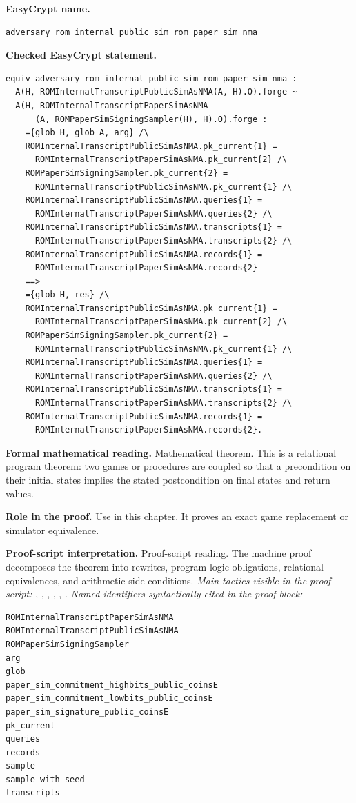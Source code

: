 \begin{formaltheorem}
\noindent\textbf{EasyCrypt name.}
\begin{lstlisting}[language=EasyCrypt,basicstyle=\ttfamily\scriptsize]
adversary_rom_internal_public_sim_rom_paper_sim_nma
\end{lstlisting}
\noindent\textbf{Checked EasyCrypt statement.}
\begin{lstlisting}[language=EasyCrypt,basicstyle=\ttfamily\scriptsize]
equiv adversary_rom_internal_public_sim_rom_paper_sim_nma :
  A(H, ROMInternalTranscriptPublicSimAsNMA(A, H).O).forge ~
  A(H, ROMInternalTranscriptPaperSimAsNMA
      (A, ROMPaperSimSigningSampler(H), H).O).forge :
    ={glob H, glob A, arg} /\
    ROMInternalTranscriptPublicSimAsNMA.pk_current{1} =
      ROMInternalTranscriptPaperSimAsNMA.pk_current{2} /\
    ROMPaperSimSigningSampler.pk_current{2} =
      ROMInternalTranscriptPublicSimAsNMA.pk_current{1} /\
    ROMInternalTranscriptPublicSimAsNMA.queries{1} =
      ROMInternalTranscriptPaperSimAsNMA.queries{2} /\
    ROMInternalTranscriptPublicSimAsNMA.transcripts{1} =
      ROMInternalTranscriptPaperSimAsNMA.transcripts{2} /\
    ROMInternalTranscriptPublicSimAsNMA.records{1} =
      ROMInternalTranscriptPaperSimAsNMA.records{2}
    ==>
    ={glob H, res} /\
    ROMInternalTranscriptPublicSimAsNMA.pk_current{1} =
      ROMInternalTranscriptPaperSimAsNMA.pk_current{2} /\
    ROMPaperSimSigningSampler.pk_current{2} =
      ROMInternalTranscriptPublicSimAsNMA.pk_current{1} /\
    ROMInternalTranscriptPublicSimAsNMA.queries{1} =
      ROMInternalTranscriptPaperSimAsNMA.queries{2} /\
    ROMInternalTranscriptPublicSimAsNMA.transcripts{1} =
      ROMInternalTranscriptPaperSimAsNMA.transcripts{2} /\
    ROMInternalTranscriptPublicSimAsNMA.records{1} =
      ROMInternalTranscriptPaperSimAsNMA.records{2}.
\end{lstlisting}
\noindent\textbf{Formal mathematical reading.}
Mathematical theorem. This is a relational program theorem: two games or procedures are coupled so that a precondition on their initial states implies the stated postcondition on final states and return values.

\noindent\textbf{Role in the proof.}
Use in this chapter. It proves an exact game replacement or simulator equivalence.

\noindent\textbf{Proof-script interpretation.}
Proof-script reading. The machine proof decomposes the theorem into rewrites, program-logic obligations, relational equivalences, and arithmetic side conditions.
\emph{Main tactics visible in the proof script:} , , , , , .
\emph{Named identifiers syntactically cited in the proof block:}
\begin{lstlisting}[language=EasyCrypt,basicstyle=\ttfamily\scriptsize]
ROMInternalTranscriptPaperSimAsNMA
ROMInternalTranscriptPublicSimAsNMA
ROMPaperSimSigningSampler
arg
glob
paper_sim_commitment_highbits_public_coinsE
paper_sim_commitment_lowbits_public_coinsE
paper_sim_signature_public_coinsE
pk_current
queries
records
sample
sample_with_seed
transcripts
\end{lstlisting}

\end{formaltheorem}

